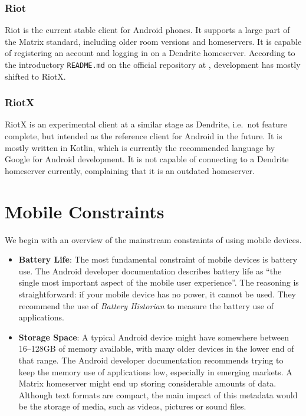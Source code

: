 \subsubsection{Riot}
Riot is the current stable client for Android phones.
It supports a large part of the Matrix standard, including older room versions and homeservers.
It is capable of registering an account and logging in on a Dendrite homeserver.
According to the introductory \texttt{README.md} on the official repository at , development has mostly shifted to RiotX.

\subsubsection{RiotX}
RiotX is an experimental client at a similar stage as Dendrite, i.e.~not feature complete, but intended as the reference client for Android in the future.
It is mostly written in Kotlin, which is currently the recommended language by Google for Android development.
It is not capable of connecting to a Dendrite homeserver currently, complaining that it is an outdated homeserver.

\section{Mobile Constraints}\label{sec:mobile_constraints}
We begin with an overview of the mainstream constraints of using mobile devices.

\begin{itemize}
	\item{
	      \textbf{Battery Life}:
	      The most fundamental constraint of mobile devices is battery use.
	      The Android developer documentation describes battery life as ``the single most important aspect of the mobile user experience''\cite{android_devdocs_power}.
	      The reasoning is straightforward: if your mobile device has no power, it cannot be used.
	      They recommend the use of \textit{Battery Historian}\cite{battery_historian} to measure the battery use of applications.
	      }
	\item{
	      \textbf{Storage Space}:
	      A typical Android device might have somewhere between 16--128GB of memory available, with many older devices in the lower end of that range.
	      The Android developer documentation recommends trying to keep the memory use of applications low, especially in emerging markets\cite{android_devdocs_apksize}.
	      A Matrix homeserver might end up storing considerable amounts of data.
	      Although text formats are compact, the main impact of this metadata would be the storage of media, such as videos, pictures or sound files.
	      }
\end{itemize}

